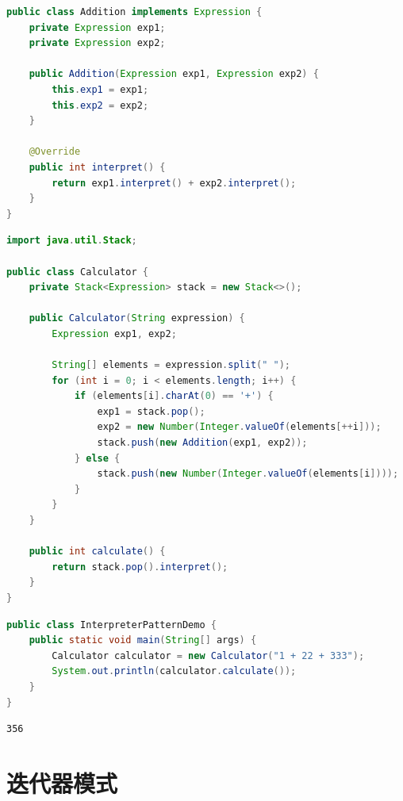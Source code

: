 \begin{lstlisting}[language=Java, title=Addition.java]
public class Addition implements Expression {
    private Expression exp1;
    private Expression exp2;

    public Addition(Expression exp1, Expression exp2) {
        this.exp1 = exp1;
        this.exp2 = exp2;
    }

    @Override
    public int interpret() {
        return exp1.interpret() + exp2.interpret();
    }
}
\end{lstlisting}

\begin{lstlisting}[language=Java, title=Calculator.java]
import java.util.Stack;

public class Calculator {
    private Stack<Expression> stack = new Stack<>();

    public Calculator(String expression) {
        Expression exp1, exp2;

        String[] elements = expression.split(" ");
        for (int i = 0; i < elements.length; i++) {
            if (elements[i].charAt(0) == '+') {
                exp1 = stack.pop();
                exp2 = new Number(Integer.valueOf(elements[++i]));
                stack.push(new Addition(exp1, exp2));
            } else {
                stack.push(new Number(Integer.valueOf(elements[i])));
            }
        }
    }

    public int calculate() {
        return stack.pop().interpret();
    }
}
\end{lstlisting}

\begin{lstlisting}[language=Java, title=InterpreterPatternDemo.java]
public class InterpreterPatternDemo {
    public static void main(String[] args) {
        Calculator calculator = new Calculator("1 + 22 + 333");
        System.out.println(calculator.calculate());
    }
}  
\end{lstlisting}

\begin{tcolorbox}
    \begin{verbatim}
356
\end{verbatim}
\end{tcolorbox}

\newpage

\section{迭代器模式}

